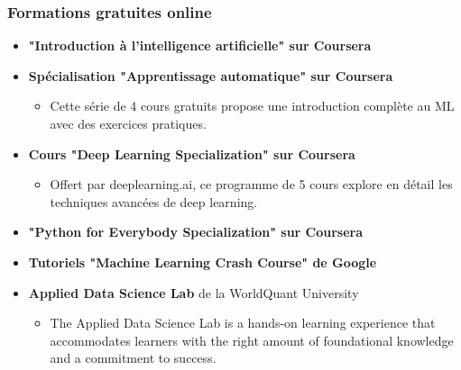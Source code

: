 \documentclass{beamer}
\begin{document}
\begin{frame}
	\frametitle{Formations gratuites online}
	\begin{tcolorbox}[colback=gray!5,colframe=gray!50!black,title=Formations gratuites à recommander]
		
		\begin{itemize}
			\item \textbf{ "Introduction à l'intelligence artificielle" sur Coursera}

			\item \textbf{Spécialisation "Apprentissage automatique" sur Coursera}
			\begin{itemize}
				\item Cette série de 4 cours gratuits propose une introduction complète au ML avec des exercices pratiques.
			\end{itemize}
			\item \textbf{Cours "Deep Learning Specialization" sur Coursera}
			\begin{itemize}
				\item Offert par deeplearning.ai, ce programme de 5 cours explore en détail les techniques avancées de deep learning.
			\end{itemize}
			\item \textbf{"Python for Everybody Specialization" sur Coursera}
			\item \textbf{Tutoriels "Machine Learning Crash Course" de Google}
			\item \textbf{Applied Data Science Lab} de la WorldQuant University
		\begin{itemize}
			\item The Applied Data Science Lab is a hands-on learning experience that accommodates learners with the right amount of foundational knowledge and a commitment to success.
		\end{itemize}
		\end{itemize}
	\end{tcolorbox}
\end{frame}
\end{document}
